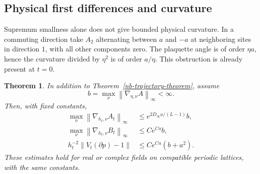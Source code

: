 \documentclass[11pt]{article}
\newtheorem{theorem}{Theorem}[section]
\theoremstyle{remark}
\newcommand{\norm}[1]{\left\|#1\right\|}
\begin{document}
\subsection{Physical first differences and curvature}

Supremum smallness alone does not give bounded physical
curvature. In a commuting direction take $A_2$ alternating
between $a$ and $-a$ at neighboring sites in direction $1$,
with all other components zero. The plaquette angle is of
order $\eta a$, hence the curvature divided by $\eta^2$ is
of order $a/\eta$. This obstruction is already present at $t=0$.

\begin{theorem}\label{nb-C1-theorem}
In addition to Theorem~\ref{nb-trajectory-theorem}, assume
\begin{equation}\label{nb-input-gradient}
 b=\max_\nu\norm{\nabla_{\eta,\nu}A}_\infty<\infty.
\end{equation}
Then, with fixed constants,
\begin{align}
 \max_\nu\norm{\nabla_{h_t,\nu}A_t}_\infty
       &\le e^{2D_\infty a/(L-1)}b,
                                      \label{nb-corrected-C1}\\
 \max_\nu\norm{\nabla_{h_t,\nu}B_t}_\infty
       &\le C e^{Ca}b,                  \label{nb-ordinary-C1}\\
 h_t^{-2}\norm{V_t(\partial p)-1}
       &\le C e^{Ca}(b+a^2).            \label{nb-curvature}
\end{align}
These estimates hold for real or complex fields on compatible
periodic lattices, with the same constants.
\end{theorem}
\end{document}

